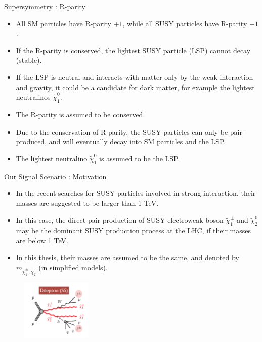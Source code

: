 \documentclass[mathserif,serif]{beamer}
\begin{document}
\begin{frame}{Supersymmetry : R-parity}
\begin{itemize}
\item All SM particles have R-parity $+1$, while all SUSY particles have R-parity $-1$.
\item If the R-parity is conserved, the lightest SUSY particle (LSP) cannot decay (stable).
\item If the LSP is neutral and interacts with matter only by the weak interaction and gravity, it could be a candidate for dark matter, for example the lightest neutralinos $\tilde{\chi}_1^0$.
\item The R-parity is assumed to be conserved.
\item Due to the conservation of R-parity, the SUSY particles can only be pair-produced, and will eventually decay into SM particles and the LSP.
\item The lightest neutralino $\tilde{\chi}_1^0$ is assumed to be the LSP.
\end{itemize}
\end{frame}

\begin{frame}{Our Signal Scenario : Motivation}
\begin{itemize}
\item In the recent searches for SUSY particles involved in strong interaction, their masses are suggested to be larger than 1 TeV.
\item In this case, the direct pair production of SUSY electroweak boson $\tilde{\chi}_1^\pm$  and $\tilde{\chi}_2^0$ may be the dominant SUSY production process at the LHC, if their masses are below 1 TeV.
\item In this thesis, their masses are assumed to be the same, and denoted by $m_{\tilde{\chi}_1^\pm , \tilde{\chi}_2^0}$ (in simplified models).
\end{itemize}
\begin{figure}
\centering
\includegraphics[width=0.3\textwidth]{data/photo/theory/signal_feynman.png}
\end{figure}
\end{frame}
\end{document}
